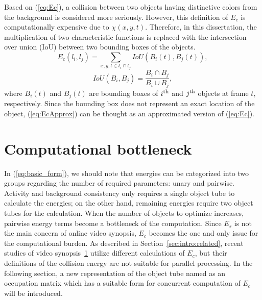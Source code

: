 \documentclass[11pt]{hyu_thesis}
\begin{document}
Based on (\ref{eq:Ec}), a collision between two objects having distinctive colors from the background is considered more seriously. However, this definition of $E_c$ is computationally expensive due to $\chi(x,y,t)$. Therefore, in this dissertation, the multiplication of two characteristic functions is replaced with the intersection over union (IoU) between two bounding boxes of the objects.
\begin{equation}
\label{eq:EcApprox}
E_c(l_i,l_j)=\sum_{x,y,t \in t_i \cap t_j} IoU \left( B_i(t),B_j(t) \right),
\end{equation}
\begin{equation}
IoU(B_i,B_j)=\frac{B_i \cap B_j}{B_i \cup B_j},
\end{equation}
where $B_i(t)$ and $B_j(t)$ are bounding boxes of $i^{\rm{th}}$ and $j^{\rm{th}}$ objects at frame $t$, respectively. Since the bounding box does not represent an exact location of the object, (\ref{eq:EcApprox}) can be thought as an approximated version of (\ref{eq:Ec}).

\section{Computational bottleneck}
In (\ref{eq:basic_form}), we should note that energies can be categorized into two groups regarding the number of required parameters: unary and pairwise. Activity and background consistency only requires a single object tube to calculate the energies; on the other hand, remaining energies require two object tubes for the calculation. When the number of objects to optimize increases, pairwise energy terms become a bottleneck of the computation. Since $E_s$ is not the main concern of online video synopsis, $E_c$ becomes the one and only issue for the computational burden. As described in Section~\ref{sec:intro:related}, recent studies of video synopsis~\ref{} utilize different calculations of $E_c$, but their definitions of the collision energy are not suitable for parallel processing. In the following section, a new representation of the object tube named as an occupation matrix which has a suitable form for concurrent computation of $E_c$ will be introduced.
\end{document}
